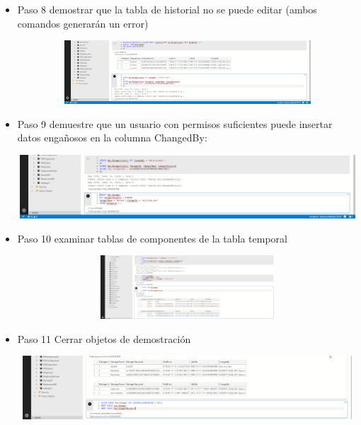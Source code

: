 \begin{itemize}
   				    \item Paso 8 demostrar que la tabla de historial no se puede editar (ambos comandos generarán un error)
				 
				 \begin{center}
    				\includegraphics[width=16cm, height=90]{./Imagenes/Imagen7}
   				    \end{center}   
   				    
   				    \item Paso 9 demuestre que un usuario con permisos suficientes puede insertar datos engañosos en la columna ChangedBy:
				 
				 \begin{center}
    				\includegraphics[width=16cm, height=90]{./Imagenes/Imagen8}
   				    \end{center}   
   				    \clearpage
   				    \item Paso 10 examinar tablas de componentes de la tabla temporal
				 
				 \begin{center}
    				\includegraphics[width=16cm, height=90]{./Imagenes/Imagen9}
   				    \end{center} 	
   				    
   				     \item Paso 11 Cerrar objetos de demostración
				 
				 \begin{center}
    				\includegraphics[width=16cm, height=90]{./Imagenes/Imagen10}
   				    \end{center} 		 
				 
				 
				 
				  
				 				  
				   \end{itemize}

